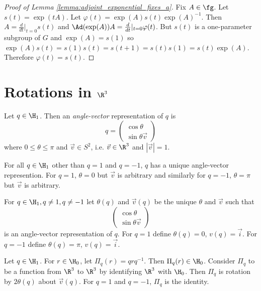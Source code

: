 \documentclass[oneside,12pt]{amsart}
\begin{document}
\begin{proof}[Proof of Lemma \ref{lemma:adjoint_exponential_fixes_a}]
Fix $A\in\fg$. Let $s(t) = \exp(tA)$. Let $\varphi(t) = \exp(A) s(t) \exp(A)^{-1}$.
Then $A = \frac{d}{dt}\vert_{t=0} s(t)$ and $\Ad(\exp(A)) A = \frac{d}{dt}\vert_{t=0} \varphi(t)$.
But $s(t)$ is a one-parameter subgroup of $G$ and $\exp(A)=s(1)$ so $\exp(A) s(t) = s(1)s(t) = s(t+1) = s(t)s(1) = s(t)\exp(A)$. Therefore $\varphi(t)=s(t)$.
\end{proof}

\section{Rotations in $\R^3$}
\begin{definition}
Let $q\in\H_1$. Then an \emph{angle-vector} representation of $q$ is
$$q = \begin{pmatrix} \cos \theta \\ \sin \theta \vec{v} \end{pmatrix}$$
where $0\leq\theta\leq\pi$ and $\vec{v}\in S^2$, i.e. $\vec{v}\in\R^3$ and $|\vec{v}| = 1$.
\end{definition}

\begin{remark}
For all $q\in\H_1$ other than $q=1$ and $q=-1$, $q$ has a unique angle-vector represention.
For $q=1$, $\theta=0$ but $\vec{v}$ is arbitrary and similarly
for $q=-1$, $\theta=\pi$ but $\vec{v}$ is arbitrary.
\end{remark}

\begin{definition}
For $q\in\H_1, q \not= 1, q\not=-1$ let $\theta(q)$ and $\vec{v}(q)$ be the unique
$\theta$ and $\vec{v}$ such that
$$\begin{pmatrix} \cos \theta \\ \sin \theta \vec{v} \end{pmatrix}$$
is an angle-vector representation of $q$. For $q=1$ define $\theta(q)=0$, $v(q)=\vec{i}$.
For $q=-1$ define $\theta(q)=\pi$, $v(q)=\vec{i}$.
\end{definition}

\begin{theorem}
Let $q\in\H_1$. For $r\in\H_0$, let $\Pi_q(r) =q r q^{-1}.$
Then $\Pi_q(r)\in \H_0$.
Consider $\Pi_q$ to be a function from $\R^3$ to $\R^3$
by identifying $\R^3$ with $\H_0$. Then $\Pi_q$ is rotation by $2\theta(q)$
about $\vec{v}(q)$. For $q=1$ and $q=-1$, $\Pi_q$ is the identity.
\end{theorem}





\end{document}
